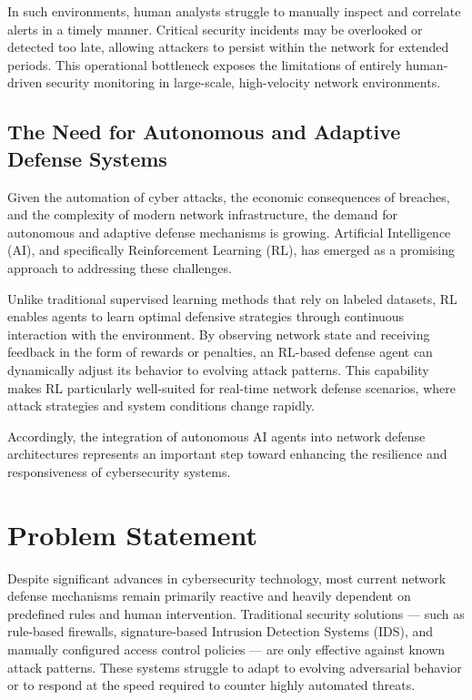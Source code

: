 \documentclass[12pt,a4paper]{report}
\begin{document}
In such environments, human analysts struggle to manually inspect and correlate alerts in a timely manner. Critical security incidents may be overlooked or detected too late, allowing attackers to persist within the network for extended periods. This operational bottleneck exposes the limitations of entirely human-driven security monitoring in large-scale, high-velocity network environments.

\subsection{The Need for Autonomous and Adaptive Defense Systems}

Given the automation of cyber attacks, the economic consequences of breaches, and the complexity of modern network infrastructure, the demand for autonomous and adaptive defense mechanisms is growing. Artificial Intelligence (AI), and specifically Reinforcement Learning (RL), has emerged as a promising approach to addressing these challenges.

Unlike traditional supervised learning methods that rely on labeled datasets, RL enables agents to learn optimal defensive strategies through continuous interaction with the environment. By observing network state and receiving feedback in the form of rewards or penalties, an RL-based defense agent can dynamically adjust its behavior to evolving attack patterns. This capability makes RL particularly well-suited for real-time network defense scenarios, where attack strategies and system conditions change rapidly.

Accordingly, the integration of autonomous AI agents into network defense architectures represents an important step toward enhancing the resilience and responsiveness of cybersecurity systems.

\section{Problem Statement}

Despite significant advances in cybersecurity technology, most current network defense mechanisms remain primarily reactive and heavily dependent on predefined rules and human intervention. Traditional security solutions — such as rule-based firewalls, signature-based Intrusion Detection Systems (IDS), and manually configured access control policies — are only effective against known attack patterns. These systems struggle to adapt to evolving adversarial behavior or to respond at the speed required to counter highly automated threats.
\end{document}
